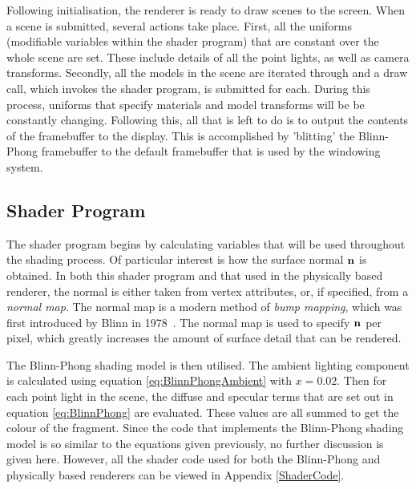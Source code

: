 Following initialisation, the renderer is ready to draw scenes to the screen. When a scene is submitted, several actions take place. First, all the uniforms (modifiable variables within the shader program) that are constant over the whole scene are set. These include details of all the point lights, as well as camera transforms. Secondly, all the models in the scene are iterated through and a draw call, which invokes the shader program, is submitted for each. During this process, uniforms that specify materials and model transforms will be be constantly changing. Following this, all that is left to do is to output the contents of the framebuffer to the display. This is accomplished by 'blitting' the Blinn-Phong framebuffer to the default framebuffer that is used by the windowing system.

\subsection{Shader Program} \label{BlinnPhongRendererShaderProgram}

The shader program begins by calculating variables that will be used throughout the shading process. Of particular interest is how the surface normal \begin{math}\mathbf{n}\end{math} is obtained. In both this shader program and that used in the physically based renderer, the normal is either taken from vertex attributes, or, if specified, from a \textit{normal map}. The normal map is a modern method of \textit{bump mapping}, which was first introduced by Blinn in 1978~\cite{BlinnBumpMapping}. The normal map is used to specify \begin{math}\mathbf{n}\end{math} per pixel, which greatly increases the amount of surface detail that can be rendered.

The Blinn-Phong shading model is then utilised. The ambient lighting component is calculated using equation \ref{eq:BlinnPhongAmbient} with \begin{math}x = 0.02\end{math}. Then for each point light in the scene, the diffuse and specular terms that are set out in equation \ref{eq:BlinnPhong} are evaluated. These values are all summed to get the colour of the fragment. Since the code that implements the Blinn-Phong shading model is so similar to the equations given previously, no further discussion is given here. However, all the shader code used for both the Blinn-Phong and physically based renderers can be viewed in Appendix \ref{ShaderCode}.

